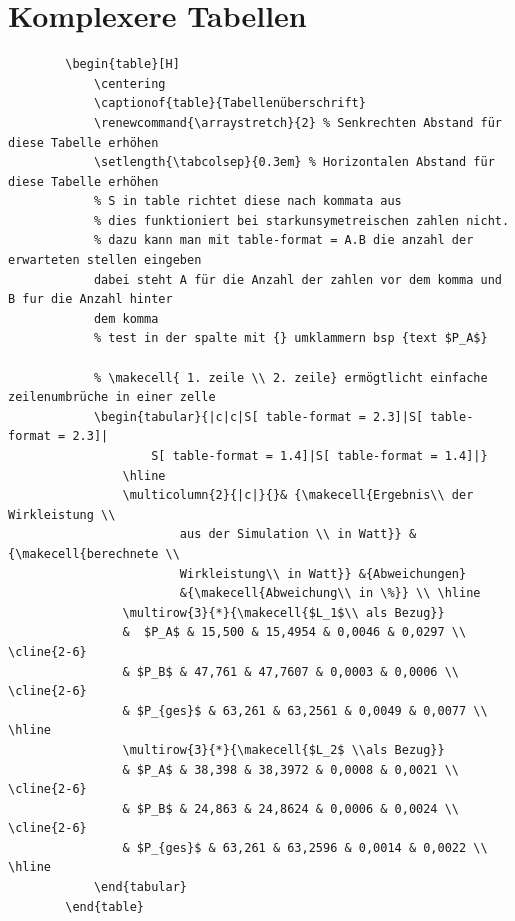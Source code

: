 \documentclass[
12pt,
a4paper,
headings=small,                    %
bibliography=totoc,                %
listof=totoc,                      %
parskip=half*,                     %
]{scrartcl}                        %
\renewcommand{\arraystretch}{1.15}
\begin{document}
	\section{Komplexere Tabellen}
	\begin{verbatim}
		\begin{table}[H]
			\centering
			\captionof{table}{Tabellenüberschrift}
			\renewcommand{\arraystretch}{2} % Senkrechten Abstand für diese Tabelle erhöhen
			\setlength{\tabcolsep}{0.3em} % Horizontalen Abstand für diese Tabelle erhöhen
			% S in table richtet diese nach kommata aus
			% dies funktioniert bei starkunsymetreischen zahlen nicht.
			% dazu kann man mit table-format = A.B die anzahl der erwarteten stellen eingeben 
			dabei steht A für die Anzahl der zahlen vor dem komma und B fur die Anzahl hinter 
			dem komma
			% test in der spalte mit {} umklammern bsp {text $P_A$}
			
			% \makecell{ 1. zeile \\ 2. zeile} ermögtlicht einfache zeilenumbrüche in einer zelle
			\begin{tabular}{|c|c|S[ table-format = 2.3]|S[ table-format = 2.3]|
					S[ table-format = 1.4]|S[ table-format = 1.4]|}
				\hline
				\multicolumn{2}{|c|}{}& {\makecell{Ergebnis\\ der Wirkleistung \\ 
						aus der Simulation \\ in Watt}} & {\makecell{berechnete \\
						Wirkleistung\\ in Watt}} &{Abweichungen} 
					    &{\makecell{Abweichung\\ in \%}} \\ \hline
				\multirow{3}{*}{\makecell{$L_1$\\ als Bezug}} 
				&  $P_A$ & 15,500 & 15,4954 & 0,0046 & 0,0297 \\ \cline{2-6} 
				& $P_B$ & 47,761 & 47,7607 & 0,0003 & 0,0006 \\ \cline{2-6} 
				& $P_{ges}$ & 63,261 & 63,2561 & 0,0049 & 0,0077 \\ \hline
				\multirow{3}{*}{\makecell{$L_2$ \\als Bezug}}
				& $P_A$ & 38,398 & 38,3972 & 0,0008 & 0,0021 \\ \cline{2-6} 
				& $P_B$ & 24,863 & 24,8624 & 0,0006 & 0,0024 \\ \cline{2-6} 
				& $P_{ges}$ & 63,261 & 63,2596 & 0,0014 & 0,0022 \\ \hline
			\end{tabular}
		\end{table}
	\end{verbatim}
\end{document}
